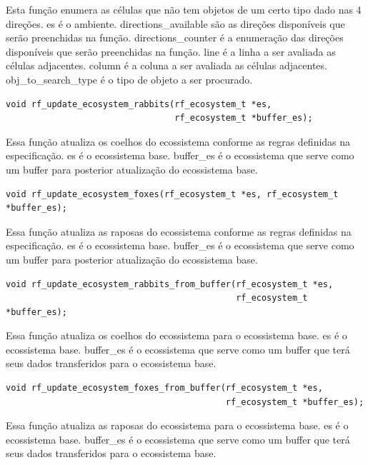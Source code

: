 \documentclass{article}
\begin{document}
Esta função enumera as células que não tem objetos de um certo tipo dado nas 4 direções.
es é o ambiente.
directions\_available são as direções disponíveis que serão preenchidas na função.
directions\_counter é a enumeração das direções disponíveis que serão preenchidas na função.
line é a linha a ser avaliada as células adjacentes.
column é a coluna a ser avaliada as células adjacentes.
obj\_to\_search\_type é o tipo de objeto a ser procurado.



\begin{verbatim}
void rf_update_ecosystem_rabbits(rf_ecosystem_t *es,
                                 rf_ecosystem_t *buffer_es);
      \end{verbatim}

Essa função atualiza os coelhos do ecossistema conforme as regras definidas na especificação.
es é o ecossistema base.
buffer\_es é o ecossistema que serve como um buffer para posterior atualização do ecossistema base.



\begin{verbatim}
void rf_update_ecosystem_foxes(rf_ecosystem_t *es, rf_ecosystem_t *buffer_es);
      \end{verbatim}


Essa função atualiza as raposas do ecossistema conforme as regras definidas na especificação.
es é o ecossistema base.
buffer\_es é o ecossistema que serve como um buffer para posterior atualização do ecossistema base.

\begin{verbatim}
void rf_update_ecosystem_rabbits_from_buffer(rf_ecosystem_t *es,
                                             rf_ecosystem_t *buffer_es);
      \end{verbatim}

Essa função atualiza os coelhos do ecossistema para o ecossistema base.
es é o ecossistema base.
buffer\_es é o ecossistema que serve como um buffer que terá seus dados transferidos para o ecossistema base.



\begin{verbatim}
void rf_update_ecosystem_foxes_from_buffer(rf_ecosystem_t *es,
                                           rf_ecosystem_t *buffer_es);
      \end{verbatim}

Essa função atualiza as raposas do ecossistema para o ecossistema base.
es é o ecossistema base.
buffer\_es é o ecossistema que serve como um buffer que terá seus dados transferidos para o ecossistema base.
\end{document}
